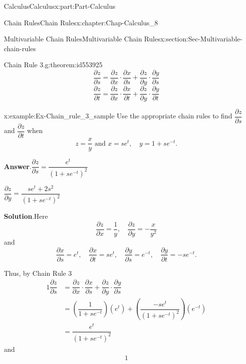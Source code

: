 \documentclass[oneside,10pt,]{book}
\newcommand{\blocktitlefont}{\relax}
\numberwithin{equation}{section}
\newcommand{\amp}{&}
\begin{document}
\begin{partptx}{Calculus}{}{Calculus}{}{}{x:part:Part-Calculus}
\begin{chapterptx}{Chain Rules}{}{Chain Rules}{}{}{x:chapter:Chap-Calculus_8}
\begin{sectionptx}{Multivariable Chain Rules}{}{Multivariable Chain Rules}{}{}{x:section:Sec-Multivariable-chain-rules}
\begin{theorem}{Chain Rule 3.}{}{g:theorem:id553925}
\begin{equation*}
\dfrac{\partial z}{\partial s} = \dfrac{\partial z}{\partial x} \cdot \dfrac{\partial x}{\partial s} + \dfrac{\partial z}{\partial y} \cdot \dfrac{\partial y}{\partial s}
\end{equation*}
%
\begin{equation*}
\dfrac{\partial z}{\partial t} = \dfrac{\partial z}{\partial x} \cdot \dfrac{\partial x}{\partial t} + \dfrac{\partial z}{\partial y} \cdot \dfrac{\partial y}{\partial t}
\end{equation*}
%
\end{theorem}
\begin{example}{}{x:example:Ex-Chain_rule_3_sample}%
Use the appropriate chain rules to find \(\dfrac{\partial z}{\partial s}\) and \(\dfrac{\partial z}{\partial t}\) when%
\begin{equation*}
z = \dfrac{x}{y} \text{ and } x = se^t, \quad y = 1+se^{-t}.
\end{equation*}
%
\par\smallskip%
\noindent\textbf{\blocktitlefont Answer}.\hypertarget{g:answer:id553972}{}\quad{}\(\dfrac{\partial z}{\partial s} = \dfrac{e^t}{(1+se^{-t})^2}\)%
\par
\(\dfrac{\partial z}{\partial y} = \dfrac{se^t+2s^2}{(1+se^{-t})^2}\)%
\par\smallskip%
\noindent\textbf{\blocktitlefont Solution}.\hypertarget{g:solution:id554030}{}\quad{}Here%
\begin{equation*}
\dfrac{\partial z}{\partial x} = \dfrac{1}{y}, \quad \dfrac{\partial z}{\partial y} = -\dfrac{x}{y^2}
\end{equation*}
and%
\begin{equation*}
\dfrac{\partial x}{\partial s} = e^t, \quad \dfrac{\partial x}{\partial t} = se^t, \quad \dfrac{\partial y}{\partial s}=e^{-t}, \quad \dfrac{\partial y}{\partial t}=-se^{-t}.
\end{equation*}
%
\par
Thus, by Chain Rule 3%
\begin{alignat*}{1}
\dfrac{\partial z}{\partial s} \amp = \dfrac{\partial z}{\partial x} \cdot \dfrac{\partial x}{\partial s} + \dfrac{\partial z}{\partial y} \cdot \dfrac{\partial y}{\partial s}\\
\amp =  \left(\dfrac{1}{1+se^{-t}}\right)(e^t) + \left(\dfrac{-se^t}{(1+se^{-t})^2}\right)(e^{-t})\\
\amp =  \dfrac{e^t}{(1+se^{-t})^2}
\end{alignat*}
and%
\begin{alignat*}{1}

\end{alignat*}
\end{example}
\end{sectionptx}
\end{chapterptx}
\end{partptx}
\end{document}
